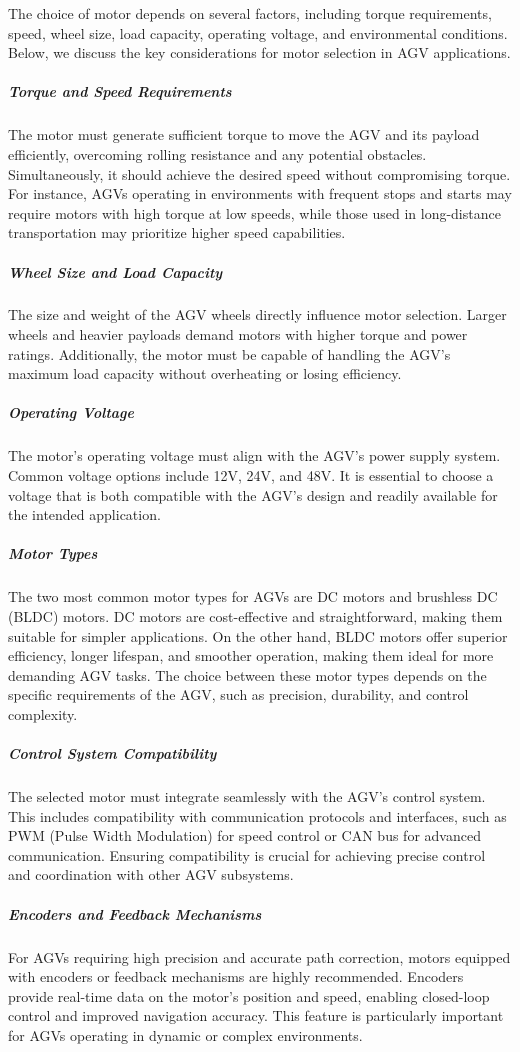 \documentclass[../../main]{subfiles}
\begin{document}
The choice of motor depends on several factors, including torque requirements, speed, wheel size, load capacity, operating voltage, and environmental conditions. Below, we discuss the key considerations for motor selection in AGV applications.

\subparagraph{Torque and Speed Requirements}
The motor must generate sufficient torque to move the AGV and its payload efficiently, overcoming rolling resistance and any potential obstacles. Simultaneously, it should achieve the desired speed without compromising torque. For instance, AGVs operating in environments with frequent stops and starts may require motors with high torque at low speeds, while those used in long-distance transportation may prioritize higher speed capabilities.

\subparagraph{Wheel Size and Load Capacity}
The size and weight of the AGV wheels directly influence motor selection. Larger wheels and heavier payloads demand motors with higher torque and power ratings. Additionally, the motor must be capable of handling the AGV's maximum load capacity without overheating or losing efficiency.

\subparagraph{Operating Voltage}
The motor's operating voltage must align with the AGV's power supply system. Common voltage options include 12V, 24V, and 48V. It is essential to choose a voltage that is both compatible with the AGV's design and readily available for the intended application.

\subparagraph{Motor Types}
The two most common motor types for AGVs are DC motors and brushless DC (BLDC) motors. DC motors are cost-effective and straightforward, making them suitable for simpler applications. On the other hand, BLDC motors offer superior efficiency, longer lifespan, and smoother operation, making them ideal for more demanding AGV tasks. The choice between these motor types depends on the specific requirements of the AGV, such as precision, durability, and control complexity.

\subparagraph{Control System Compatibility}
The selected motor must integrate seamlessly with the AGV's control system. This includes compatibility with communication protocols and interfaces, such as PWM (Pulse Width Modulation) for speed control or CAN bus for advanced communication. Ensuring compatibility is crucial for achieving precise control and coordination with other AGV subsystems.

\subparagraph{Encoders and Feedback Mechanisms}
For AGVs requiring high precision and accurate path correction, motors equipped with encoders or feedback mechanisms are highly recommended. Encoders provide real-time data on the motor's position and speed, enabling closed-loop control and improved navigation accuracy. This feature is particularly important for AGVs operating in dynamic or complex environments.
\end{document}

